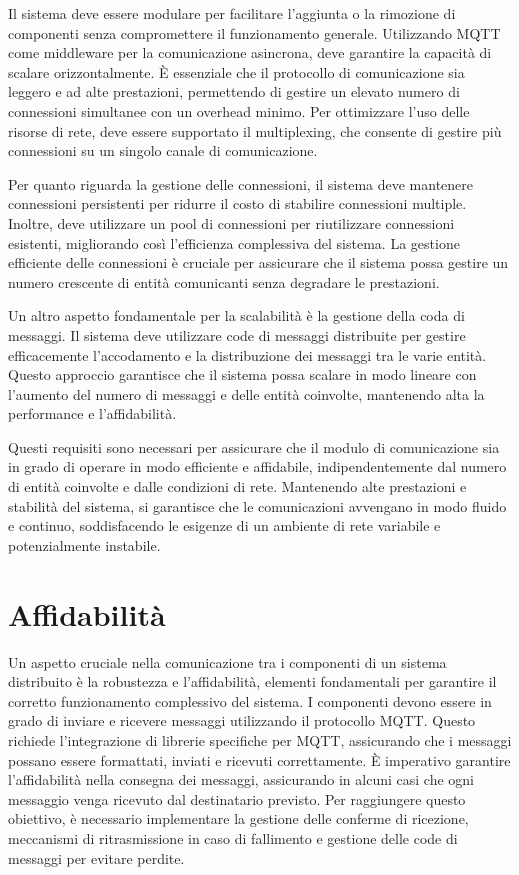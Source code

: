 \documentclass[12pt,a4paper,openright,twoside]{book}
\begin{document}
Il sistema deve essere modulare per facilitare l'aggiunta o la rimozione di componenti senza compromettere il funzionamento generale. 
Utilizzando \ac{MQTT} come middleware per la comunicazione asincrona, deve garantire la capacità di scalare orizzontalmente. 
È essenziale che il protocollo di comunicazione sia leggero e ad alte prestazioni, permettendo di gestire un elevato numero di connessioni simultanee 
con un overhead minimo. Per ottimizzare l'uso delle risorse di rete, deve essere supportato il multiplexing, che consente di gestire più connessioni 
su un singolo canale di comunicazione.

Per quanto riguarda la gestione delle connessioni, il sistema deve mantenere connessioni persistenti per ridurre il costo di stabilire connessioni multiple. 
Inoltre, deve utilizzare un pool di connessioni per riutilizzare connessioni esistenti, migliorando così l'efficienza complessiva del sistema. 
La gestione efficiente delle connessioni è cruciale per assicurare che il sistema possa gestire un numero crescente di entità comunicanti senza degradare le prestazioni.

Un altro aspetto fondamentale per la scalabilità è la gestione della coda di messaggi. Il sistema deve utilizzare code di messaggi distribuite per gestire efficacemente 
l'accodamento e la distribuzione dei messaggi tra le varie entità. Questo approccio garantisce che il sistema possa scalare in modo lineare con l'aumento del numero 
di messaggi e delle entità coinvolte, mantenendo alta la performance e l'affidabilità.

Questi requisiti sono necessari per assicurare che il modulo di comunicazione sia in grado di operare in modo efficiente e affidabile, 
indipendentemente dal numero di entità coinvolte e dalle condizioni di rete. Mantenendo alte prestazioni e stabilità del sistema, si garantisce che le comunicazioni 
avvengano in modo fluido e continuo, soddisfacendo le esigenze di un ambiente di rete variabile e potenzialmente instabile.

\section{Affidabilità}

Un aspetto cruciale nella comunicazione tra i componenti di un sistema distribuito è la robustezza e l'affidabilità, elementi fondamentali per garantire 
il corretto funzionamento complessivo del sistema. I componenti devono essere in grado di inviare e ricevere messaggi utilizzando il protocollo \ac{MQTT}. 
Questo richiede l'integrazione di librerie specifiche per \ac{MQTT}, assicurando che i messaggi possano essere formattati, inviati e ricevuti correttamente. 
È imperativo garantire l'affidabilità nella consegna dei messaggi, assicurando in alcuni casi che ogni messaggio venga ricevuto dal destinatario previsto. 
Per raggiungere questo obiettivo, è necessario implementare la gestione delle conferme di ricezione, meccanismi di ritrasmissione in caso di fallimento e 
gestione delle code di messaggi per evitare perdite.
\end{document}
